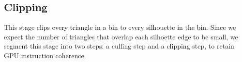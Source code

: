 \documentclass[review]{acmsiggraph}
\begin{document}

\subsection{Clipping} \label{sec:clipping}

This stage clips every triangle in a bin to every silhouette in the bin. Since
we expect the number of triangles that overlap each silhoette edge to be
small, we segment this stage into two steps: a culling step and a clipping
step, to retain GPU instruction coherence.

\end{document}
